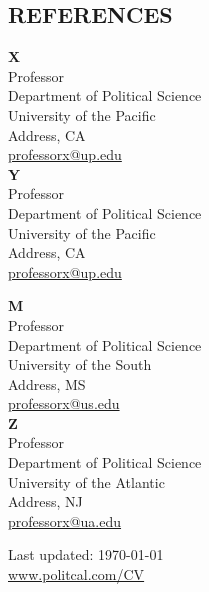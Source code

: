 \documentclass{article}
\begin{document}
\subsection*{\textbf{REFERENCES}}
\begin{minipage}[t]{.5\textwidth}
{\centering

\textbf{X}\\
Professor\\
Department of Political Science\\
University of the Pacific\\
Address, CA \\
\href{mailto:professorx@up.edu}{professorx@up.edu}\\

\vspace{10mm}
\textbf{Y}\\
Professor\\
Department of Political Science\\
University of the Pacific\\
Address, CA \\
\href{mailto:professorx@up.edu}{professorx@up.edu}\\

}
\end{minipage}
\begin{minipage}[t]{.5\textwidth}{\centering

\textbf{M}\\
Professor\\
Department of Political Science\\
University of the South\\
Address, MS \\
\href{mailto:professorx@us.edu}{professorx@us.edu}\\

\vspace{10mm}
\textbf{Z}\\
Professor\\
Department of Political Science\\
University of the Atlantic\\
Address, NJ \\
\href{mailto:professorx@ua.edu}{professorx@ua.edu}\\
}

\end{minipage}

\vfill{}

\begin{center}
{\scriptsize  Last updated: \today \\
 \href{www.politcal.com/CV}{www.politcal.com/CV}}
\end{center}
\end{document}
